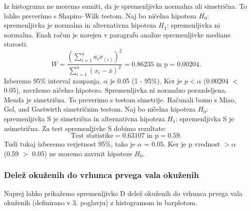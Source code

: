 \documentclass[a4paper,11pt]{article}
\begin{document}
Iz histograma ne moremo sumiti, da je spremenljivka normalna ali simetrična. To lahko preverimo s Shapiro–Wilk testom. Naj bo ničelna hipoteza \(H_0\): spremenljivka je normalna in alternativna hipoteza \(H_1\): spremenljivka ni normalna. Enak račun je narejen v paragrafu analize spremenljivke mediane starosti.
\[W = \frac{(\sum_{i = 1}^{n}a_i x_{(i)})^2}{\sum_{i = 1}^{n}(x_i - \overset{\_}{x})^2} = 0.86235 \text{ in p} = 0.00204. \]
Izberemo 95\% interval zaupanja. \(\alpha\) je 0.05 (1 - 95\%). Ker je \(p < \alpha\) (0.00204 \(<\) 0.05), zavržemo ničelno hipotezo. Spremenljivka ni normalno porazdeljena. Menda je simetrična. To preverimo s testom simetrije. Računali bomo s Miao, Gel, and Gastwirth simetričnim testom. Naj bo ničelna hipoteza \(H_0\): spremenljivka S je simetrična in alternativna hipoteza \(H_1\): spremenljivka S je asimetrična. Za test spremenljivke S dobimo rezultate:
\[\text{Test statistike} = 0.63107 \text{ in p} =  0.59.\]
Tudi tukaj izberemo verjetnost 95\%, tako je \(\alpha\) = 0.05. Ker je p vrednost \(> \alpha\) (0.59 \(>\) 0.05) ne moremo zavrnit hipoteze \(H_0\).

\subsubsection{Delež okuženih do vrhunca prvega vala okuženih}
Naprej lahko prikažemo spremenljivko D delež okuženih do vrhunca prvega vala okuženih (definirano v 3. poglavju) z histogramom in barplotom.
\end{document}
